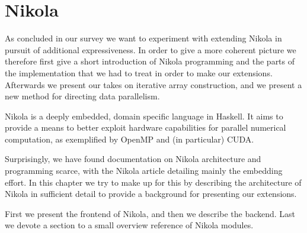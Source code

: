 \chapter{Nikola}
As concluded in our survey we want to experiment with extending Nikola in
pursuit of additional expressiveness. In order to give a more coherent picture
we therefore first give a short introduction of Nikola programming and the
parts of the implementation that we had to treat in order to make our
extensions.  Afterwards we present our takes on iterative array construction,
and we present a new method for directing data parallelism.

\vspace{1em}

Nikola is a deeply embedded, domain specific language in Haskell. It aims to
provide a means to better exploit hardware capabilities for parallel numerical
computation, as exemplified by OpenMP and (in particular) CUDA.

Surprisingly, we have found documentation on Nikola architecture and
programming scarce, with the Nikola article \cite{mainland2010nikola}
detailing mainly the embedding effort. In this chapter we try to make up for
this by describing the architecture of Nikola in sufficient detail to provide a
background for presenting our extensions.

First we present the frontend of Nikola, and then we describe the backend. Last
we devote a section to a small overview reference of Nikola modules.


